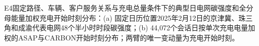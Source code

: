\caption{E4固定路径、车辆、客户服务关系与充电总量条件下的典型日电网碳强度和全分母能量加权充电开始时刻分布：\textup{(a)} 固定日历位置2025年2月12日的京津冀、珠三角和成渝代表电网48个半小时时段碳强度；\textup{(b)} 44,072个会话日按单次充电电量加权的ASAP与CARBON开始时刻分布；两臂的唯一变动量为充电开始时刻。}
\label{fig:e4-timing-migration}

